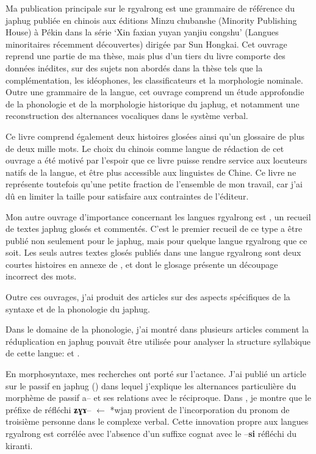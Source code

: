 \documentclass[oldfontcommands,oneside,a4paper,11pt]{memoir}
\newcommand{\ipa}[1]{{\phon\textbf{#1}}}
\begin{document}
Ma publication principale sur le rgyalrong est \citet{jacques08} une grammaire de référence du japhug publiée en chinois aux éditions Minzu chubanshe (Minority Publishing House) à Pékin dans la série ‘Xin faxian yuyan yanjiu congshu’ (Langues minoritaires récemment découvertes) dirigée par Sun Hongkai. Cet ouvrage reprend une partie de ma thèse, mais plus d’un tiers du livre comporte des données inédites, sur des sujets non abordés dans la thèse tels que la complémentation, les idéophones, les classificateurs et la morphologie nominale. Outre une grammaire de la langue, cet ouvrage comprend un étude approfondie de la phonologie et de la morphologie historique du japhug, et notamment une reconstruction des alternances vocaliques dans le système verbal.


Ce livre comprend également deux histoires glosées ainsi qu’un glossaire de plus de deux mille mots. Le choix du chinois comme langue de rédaction de cet ouvrage a été motivé par l’espoir que ce livre puisse rendre service aux locuteurs natifs de la langue, et être plus accessible aux linguistes de Chine. Ce livre ne représente toutefois qu’une petite fraction de l’ensemble de mon travail, car j’ai dû en limiter la taille pour satisfaire aux contraintes de l’éditeur.

Mon autre ouvrage d'importance concernant les langues rgyalrong est \citet{jacques10gesar}, un recueil de textes japhug glosés et commentés. C'est le premier recueil de ce type a être publié non seulement pour le japhug, mais pour quelque langue rgyalrong que ce soit. Les seuls autres textes glosés publiés dans une langue rgyalrong sont deux courtes histoires en annexe de \citet{linxr93jiarong}, et dont le glosage  présente un découpage incorrect des mots.

Outre ces ouvrages, j’ai produit des articles sur des aspects spécifiques de la syntaxe et de la phonologie du japhug. 

	Dans le domaine de la phonologie, j’ai montré dans plusieurs articles comment la réduplication en japhug pouvait être utilisée pour analyser la structure syllabique de cette langue: \citet{jacques04redupl} et \citet{jacques07redupl}.
	
	
	En morphosyntaxe, mes recherches ont porté sur l’actance. J’ai publié un article sur le passif en japhug (\citealt{jacques07passif}) dans lequel j'explique les alternances particulière du morphème de passif a-- et ses relations avec le réciproque. Dans \citet{jacques10refl}, je montre que le préfixe de réfléchi \ipa{ʑɣɤ}-- $\leftarrow$ *wjaŋ provient de l'incorporation du pronom de troisième personne dans le complexe verbal. Cette innovation propre aux langues rgyalrong est corrélée avec l'absence d'un suffixe cognat avec le --\ipa{si} réfléchi du kiranti.
	
\end{document}
